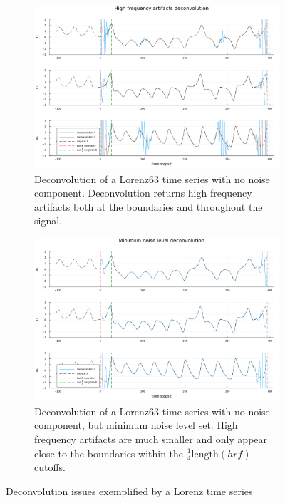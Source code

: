 \begin{figure}
    \centering

    \begin{subfigure}[b]{\textwidth}
        \centering
        \includegraphics[width=\textwidth]{Images/high_freq_issues.png}
        \caption{Deconvolution of a Lorenz63 time series with no noise component. Deconvolution returns high frequency artifacts both at the 
                 boundaries and throughout the signal.}
        \label{fig:high_freq_issues}
    \end{subfigure}

    \begin{subfigure}[b]{\textwidth}
        \centering
        \includegraphics[width=\textwidth]{Images/min_conv_noise.png}
        \caption{Deconvolution of a Lorenz63 time series with no noise component, but minimum noise level set. High frequency artifacts are much smaller and only 
                appear close to the boundaries within the $\frac{1}{4}\text{length}(hrf)$ cutoffs.}
        \label{fig:min_conv_noise}
    \end{subfigure}

       \caption[Deconvolution issues exemplified by a Lorenz63 time series]{Deconvolution issues exemplified by a Lorenz time series}
       \label{fig:three graphs}
\end{figure}

